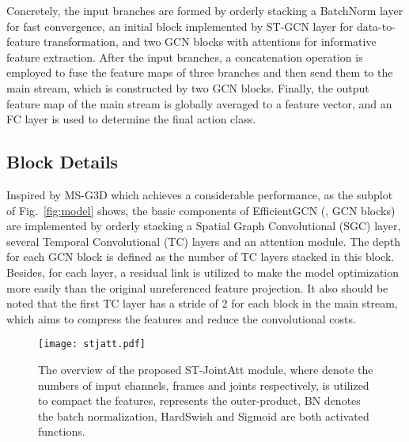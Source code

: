 \documentclass[10pt,journal,compsoc]{IEEEtran}
\begin{document}
Concretely, the input branches are formed by orderly stacking a BatchNorm layer for fast convergence, an initial block implemented by ST-GCN layer \cite{yan2018spatial} for data-to-feature transformation, and two GCN blocks with attentions for informative feature extraction. After the input branches, a concatenation operation is employed to fuse the feature maps of three branches and then send them to the main stream, which is constructed by two GCN blocks. Finally, the output feature map of the main stream is globally averaged to a feature vector, and an FC layer is used to determine the final action class.

\subsection{Block Details}
\label{ssec:block}

Inspired by MS-G3D \cite{liu2020disentangling} which achieves a considerable performance, as the subplot of Fig.~\ref{fig:model} shows, the basic components of EfficientGCN (\ie, GCN blocks) are implemented by orderly stacking a Spatial Graph Convolutional (SGC) layer, several Temporal Convolutional (TC) layers and an attention module. The depth for each GCN block is defined as the number of TC layers stacked in this block. Besides, for each layer, a residual link is utilized to make the model optimization more easily than the original unreferenced feature projection. It also should be noted that the first TC layer has a stride of 2 for each block in the main stream, which aims to compress the features and reduce the convolutional costs.

\begin{figure*}[t]
  \centerline{\texttt{[image: stjatt.pdf]}}
  \vspace{-0.4cm}
  \caption{The overview of the proposed ST-JointAtt module, where  denote the numbers of input channels, frames and joints respectively,  is utilized to compact the features,  represents the outer-product, BN denotes the batch normalization, HardSwish \cite{howard2019searching} and Sigmoid are both activated functions. \bv}\label{fig:stjatt}
  \vspace{-0.4cm}
\end{figure*}
\end{document}
